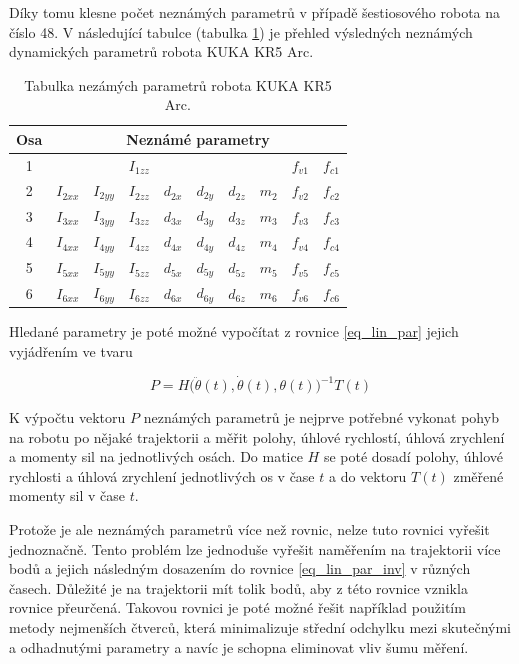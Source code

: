 Díky tomu klesne počet neznámých parametrů v případě šestiosového robota na číslo 48. V následující tabulce (tabulka \ref{tab_hled_param}) je přehled výsledných neznámých dynamických parametrů robota KUKA KR5 Arc.
\\

\begin{table}[ht]
  \centering
  \caption{Tabulka nezámých parametrů robota KUKA KR5 Arc.}
    \begin{tabular}{c|lllllllll}
    \multicolumn{1}{c|}{Osa} & \multicolumn{9}{c}{Neznámé parametry}  \\
    \hline
    1 &       	  &	          & $I_{1zz}$ &          &          &          & & $f_{v1}$ & $f_{c1}$ \\
    2 & $I_{2xx}$ & $I_{2yy}$ & $I_{2zz}$ & $d_{2x}$ & $d_{2y}$ & $d_{2z}$ & $m_{2}$ & $f_{v2}$ & $f_{c2}$ \\
    3 & $I_{3xx}$ & $I_{3yy}$ & $I_{3zz}$ & $d_{3x}$ & $d_{3y}$ & $d_{3z}$ & $m_{3}$ & $f_{v3}$ & $f_{c3}$ \\
    4 & $I_{4xx}$ & $I_{4yy}$ & $I_{4zz}$ & $d_{4x}$ & $d_{4y}$ & $d_{4z}$ & $m_{4}$ & $f_{v4}$ & $f_{c4}$ \\
    5 & $I_{5xx}$ & $I_{5yy}$ & $I_{5zz}$ & $d_{5x}$ & $d_{5y}$ & $d_{5z}$ & $m_{5}$ & $f_{v5}$ & $f_{c5}$ \\
    6 & $I_{6xx}$ & $I_{6yy}$ & $I_{6zz}$ & $d_{6x}$ & $d_{6y}$ & $d_{6z}$ & $m_{6}$ & $f_{v6}$ & $f_{c6}$ \\
    \end{tabular}%
  \label{tab_hled_param}%
\end{table}%

Hledané parametry je poté možné vypočítat z rovnice \ref{eq_lin_par} jejich vyjádřením ve tvaru

\begin{equation}
P = H\big(\ddot{\theta}(t),\dot{\theta}(t),\theta(t)\big)^{-1}T(t)
\label{eq_lin_par_inv}
\end{equation}

K výpočtu vektoru $P$ neznámých parametrů je nejprve potřebné vykonat pohyb na robotu po nějaké trajektorii a měřit polohy, úhlové rychlostí, úhlová zrychlení a momenty sil na jednotlivých osách. Do matice $H$ se poté dosadí polohy, úhlové rychlosti a úhlová zrychlení jednotlivých os v čase $t$ a do vektoru $T(t)$ změřené momenty sil v čase $t$. 

Protože je ale neznámých parametrů více než rovnic, nelze tuto rovnici vyřešit jednoznačně. Tento problém lze jednoduše vyřešit naměřením na trajektorii více bodů a jejich následným dosazením do rovnice \ref{eq_lin_par_inv} v různých časech. Důležité je na trajektorii mít tolik bodů, aby z této rovnice vznikla rovnice přeurčená. Takovou rovnici je poté možné řešit například použitím metody nejmenších čtverců, která minimalizuje střední odchylku mezi skutečnými a odhadnutými parametry a navíc je schopna eliminovat vliv šumu měření. 

